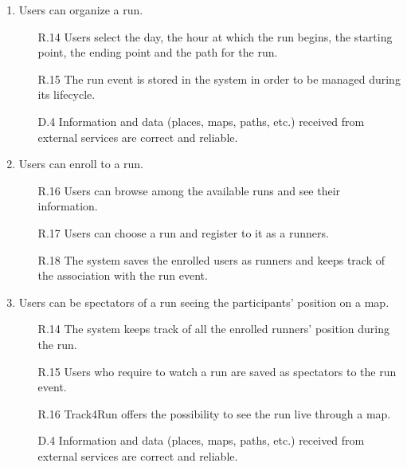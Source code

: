 \documentclass[a4paper]{article}
\begin{document}
\begin{enumerate}[label*=\bf{G.\arabic*}]
        \item Users can organize a run.
        
        \begin{enumerate}
            \item [R.14] Users select the day, the hour at which the run begins, the starting point, the ending point and the path for the run.
            \item [R.15] The run event is stored in the system in order to be managed during its lifecycle.
            \item [D.4] Information and data (places, maps, paths, etc.) received from external services are correct and reliable.
        \end{enumerate}
        
        \item Users can enroll to a run.
        
        \begin{enumerate}
            \item [R.16] Users can browse among the available runs and see their information.
            \item [R.17] Users can choose a run and register to it as a runners.
            \item [R.18] The system saves the enrolled users as runners and keeps track of the association with the run event.
        \end{enumerate}
        
        \item Users can be spectators of a run seeing the participants' position on a map.
        
        \begin{enumerate}
            \item [R.14] The system keeps track of all the enrolled runners' position during the run.
            \item [R.15] Users who require to watch a run are saved as spectators to the run event.
            \item [R.16] Track4Run offers the possibility to see the run live through a map.
            \item [D.4] Information and data (places, maps, paths, etc.) received from external services are correct and reliable.
        \end{enumerate}
        
    \end{enumerate}
    
\end{document}
